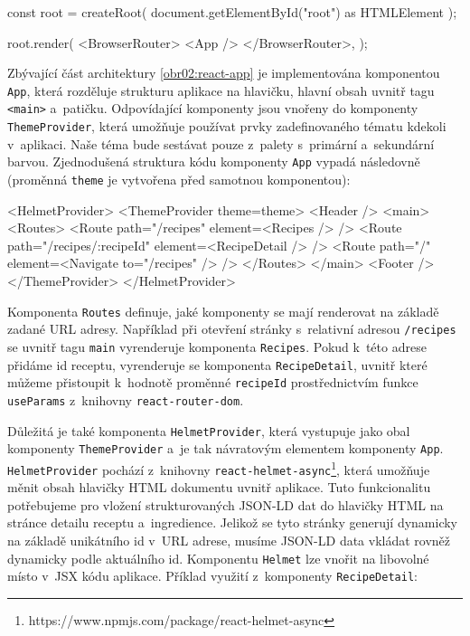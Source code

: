 \begingroup
\samepage
\begin{code}
const root = createRoot(
    document.getElementById("root") as HTMLElement
);

root.render(
    <BrowserRouter>
      <App />
    </BrowserRouter>,
);
\end{code}
\endgroup

Zbývající část architektury \ref{obr02:react-app} je implementována komponentou \texttt{App}, která rozděluje strukturu aplikace na hlavičku, hlavní obsah uvnitř tagu \texttt{<main>} a~patičku. Odpovídající komponenty jsou vnořeny do komponenty \texttt{ThemeProvider}, která umožňuje používat prvky zadefinovaného tématu kdekoli v~aplikaci. Naše téma bude sestávat pouze z~palety s~primární a~sekundární barvou. Zjednodušená struktura kódu komponenty \texttt{App} vypadá následovně (proměnná \texttt{theme} je vytvořena před samotnou komponentou):

\begingroup
\samepage
\begin{code}
<HelmetProvider>
  <ThemeProvider theme={theme}>
    <Header />
    <main>
      <Routes>
        <Route path="/recipes" element={<Recipes />} />
        <Route path="/recipes/:recipeId" element={<RecipeDetail />} />
        <Route path="/" element={<Navigate to="/recipes" />} />
      </Routes>
    </main>
    <Footer />
  </ThemeProvider>
</HelmetProvider>
\end{code}
\endgroup

Komponenta \texttt{Routes} definuje, jaké komponenty se mají renderovat na základě zadané URL adresy. Například při otevření stránky s~relativní adresou \texttt{/recipes} se uvnitř tagu \texttt{main} vyrenderuje komponenta \texttt{Recipes}. Pokud k~této adrese přidáme id receptu, vyrenderuje se komponenta \texttt{RecipeDetail}, uvnitř které můžeme přistoupit k~hodnotě proměnné \texttt{recipeId} prostřednictvím funkce \texttt{useParams} z~knihovny \texttt{react-router-dom}.

Důležitá je také komponenta \texttt{HelmetProvider}, která vystupuje jako obal komponenty \texttt{ThemeProvider} a~je tak návratovým elementem komponenty \texttt{App}. \texttt{HelmetProvider} pochází z~knihovny \texttt{react-helmet-async}\footnote{https://www.npmjs.com/package/react-helmet-async}, která umožňuje měnit obsah hlavičky HTML dokumentu uvnitř aplikace. Tuto funkcionalitu potřebujeme pro vložení strukturovaných JSON-LD dat do hlavičky HTML na stránce detailu receptu a~ingredience. Jelikož se tyto stránky generují dynamicky na základě unikátního id v~URL adrese, musíme JSON-LD data vkládat rovněž dynamicky podle aktuálního id. Komponentu \texttt{Helmet} lze vnořit na libovolné místo v~JSX kódu aplikace. Příklad využití z~komponenty \texttt{RecipeDetail}:

